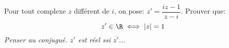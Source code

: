 \begin{exercice}
Pour tout complexe $z$ diff\'erent de $i$, on pose:
  $z'=\dfrac{iz-1}{z-i}$. Prouver que:
\[ z'\in\R \iff |z|=1\]
\emph{Penser au conjugu\'e. $z'$ est r\'eel  ssi $\overline{z'}$...}
\end{exercice}
